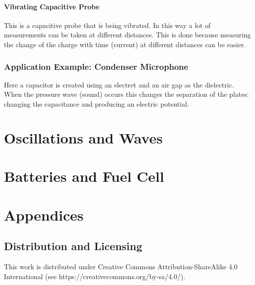 \documentclass[11pt,a4paper]{report}
\begin{document}
\subsubsection{Vibrating Capacitive Probe}
This is a capacitive probe that is being vibrated. In this way a lot of measurements can be taken at different distances. This is done because measuring the change of the charge with time (current) at different distances can be easier.

\subsection{Application Example: Condenser Microphone}
Here a capacitor is created using an electret and an air gap as the dielectric. When the pressure wave (sound) occurs this changes the separation of the plates: changing the capacitance and producing an electric potential. 

\chapter{Oscillations and Waves}

\chapter{Batteries and Fuel Cell}

\chapter{Appendices}
\section{Distribution and Licensing}
This work is distributed under Creative Commons Attribution-ShareAlike 4.0
International (see https://creativecommons.org/by-sa/4.0/).
\end{document}
